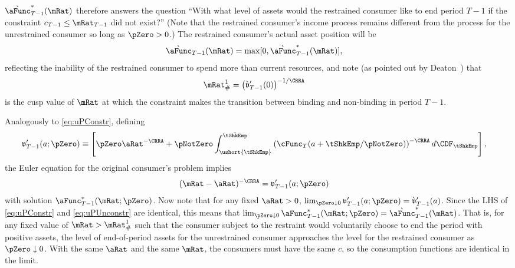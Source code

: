 \documentclass[\econtexRoot/BufferStockTeory.tex]{subfiles}
\begin{document}
$\grave{\aFunc}_{T-1}^{*}(\mRat)$ therefore answers the question ``With what
level of assets would the restrained consumer like to end period $T-1$
if the constraint $c_{T-1} \leq \mRat_{T-1}$ did not exist?''  (Note that
the restrained consumer's income process remains different from the
process for the unrestrained consumer so long as $\pZero>0$.)  The
restrained consumer's actual asset position will be
 \begin{align}
  \grave{\aFunc}_{T-1}(\mRat)  & = \max[0,\grave{\aFunc}^{*}_{T-1}(\mRat)], \notag
\end{align}
reflecting the inability of the restrained consumer to spend more than
current resources, and note (as pointed out by
Deaton~\citeyearpar{deatonLiqConstr}) that
 \begin{align}
  \mRat^{1}_{\#}  & = \left( \grave{\mathfrak{v}}_{T-1}^{\prime}(0)\right)^{-1/\CRRA} \notag
 \end{align}
is the cusp value of $\mRat$ at which the constraint makes the
transition between binding and non-binding in period $T-1$.

Analogously to \eqref{eq:uPConstr}, defining
\begin{align}
  \mathfrak{v}_{T-1}^{\prime}(a;\pZero)  & \equiv  \left[\pZero \aRat^{-\CRRA}+\pNotZero\int_{\ushort{\tShkEmp}}^{\bar{\tShkEmp}} \left(\cFunc_{T}(a+\tShkEmp/\pNotZero)\right)^{-\CRRA} d\CDF_{\tShkEmp}\right], \label{eq:vFrakPrime}
\end{align}
the Euler equation for the original consumer's problem implies
\begin{align}
 (\mRat-\aRat)^{-\CRRA}  & = \mathfrak{v}_{T-1}^{\prime}(a;\pZero) \label{eq:uPUnconstr}
\end{align}
with solution $\aFunc_{T-1}^{*}(\mRat;\pZero)$.  Now note that for any
fixed $\aRat>0$, $\lim_{\pZero \downarrow 0}
\mathfrak{v}_{T-1}^{\prime}(a;\pZero) =
\grave{\mathfrak{v}}_{T-1}^{\prime}(a)$.  Since the LHS of
\eqref{eq:uPConstr} and \eqref{eq:uPUnconstr} are identical, this
means that $\lim_{\pZero \downarrow 0}
\aFunc_{T-1}^{*}(\mRat;\pZero) =
\grave{\aFunc}_{T-1}^{*}(\mRat)$.  That is, for any fixed value of
$\mRat > \mRat^{1}_{\#}$ such that the consumer subject to the
restraint would voluntarily choose to end the period with positive
assets, the level of end-of-period assets for the unrestrained
consumer approaches the level for the restrained consumer as $\pZero
\downarrow 0$.  With the same $\aRat$ and the same $\mRat$, the
consumers must have the same $c$, so the consumption functions are
identical in the limit.
\end{document}
